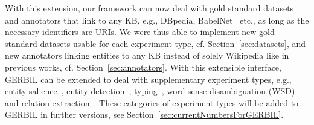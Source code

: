 With this extension, our framework can now deal with gold standard datasets and annotators that link to any \ac{KB}, e.g., DBpedia, BabelNet~\cite{NavigliPonzetto:12aij} etc., as long as the necessary identifiers are URIs.
We were thus able to implement \numberOfadditionalDatasets new gold standard datasets usable for each experiment type, cf. Section~\ref{sec:datasets}, and \numberOfadditionalAnnotators new annotators linking entities to any \ac{KB} instead of solely Wikipedia like in previous works, cf. Section~\ref{sec:annotators}.
With this extensible interface, GERBIL can be extended to deal with supplementary experiment types, e.g., entity salience~\cite{cornolti}, entity detection~\cite{FOX}, typing~\cite{rizzo2014}, word sense disambiguation (WSD)~\cite{babelfy} and relation extraction~\cite{FOX}.
These categories of experiment types will be added to GERBIL in further versions, see Section~\ref{sec:currentNumbersForGERBIL}.

